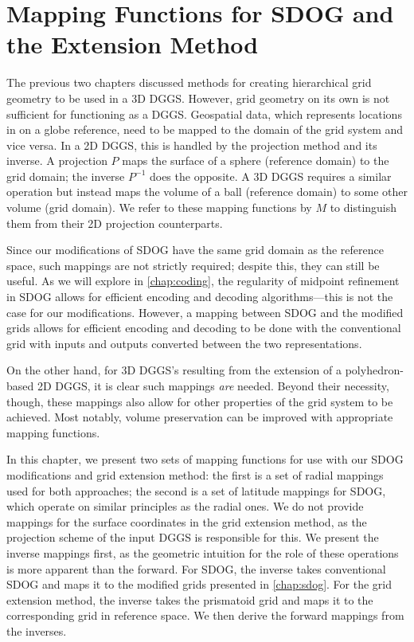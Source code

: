 \chapter{Mapping Functions for SDOG and the Extension Method} \label{chap:mapping}
The previous two chapters discussed methods for creating hierarchical grid geometry to be used in a 3D DGGS.
However, grid geometry on its own is not sufficient for functioning as a DGGS.
Geospatial data, which represents locations in on a globe reference, need to be mapped to the domain of the grid system and vice versa.
In a 2D DGGS, this is handled by the projection method and its inverse.
A projection $P$ maps the surface of a sphere (reference domain) to the grid domain; the inverse $P^{-1}$ does the opposite.
A 3D DGGS requires a similar operation but instead maps the volume of a ball (reference domain) to some other volume (grid domain).
We refer to these mapping functions by $M$ to distinguish them from their 2D projection counterparts.


Since our modifications of SDOG have the same grid domain as the reference space, such mappings are not strictly required; despite this, they can still be useful.
As we will explore in \cref{chap:coding}, the regularity of midpoint refinement in SDOG allows for efficient encoding and decoding algorithms---this is not the case for our modifications.
However, a mapping between SDOG and the modified grids allows for efficient encoding and decoding to be done with the conventional grid with inputs and outputs converted between the two representations.


On the other hand, for 3D DGGS's resulting from the extension of a polyhedron-based 2D DGGS, it is clear such mappings \textit{are} needed.
Beyond their necessity, though, these mappings also allow for other properties of the grid system to be achieved. Most notably, volume preservation can be improved with appropriate mapping functions.


In this chapter, we present two sets of mapping functions for use with our SDOG modifications and grid extension method:
the first is a set of radial mappings used for both approaches;
the second is a set of latitude mappings for SDOG, which operate on similar principles as the radial ones.
We do not provide mappings for the surface coordinates in the grid extension method, as the projection scheme of the input DGGS is responsible for this.
We present the inverse mappings first, as the geometric intuition for the role of these operations is more apparent than the forward.
For SDOG, the inverse takes conventional SDOG and maps it to the modified grids presented in \cref{chap:sdog}.
For the grid extension method, the inverse takes the prismatoid grid and maps it to the corresponding grid in reference space.
We then derive the forward mappings from the inverses.


